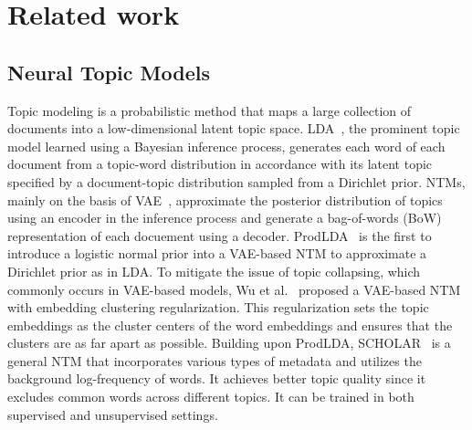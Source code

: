 \section{Related work}
\label{sec2}

\subsection{Neural Topic Models}
Topic modeling is a probabilistic method that maps a large collection of documents into a low-dimensional latent topic space.
LDA~\cite{blei2003latent}, the prominent topic model learned using a Bayesian inference process, generates each word of each document from a topic-word distribution in accordance with its latent topic specified by a document-topic distribution sampled from a Dirichlet prior. 
NTMs, mainly on the basis of VAE~\cite{welling2014auto}, approximate the posterior distribution of topics using an encoder in the inference process and generate a bag-of-words (BoW) representation of each docuement using a decoder. 
ProdLDA~\cite{srivastava2017autoencoding} is the first to introduce a logistic normal prior into a VAE-based NTM to approximate a Dirichlet prior as in LDA. 
To mitigate the issue of topic collapsing, which commonly occurs in VAE-based models, Wu et al.~\cite{wu2023effective} proposed a VAE-based NTM with embedding clustering regularization. This regularization sets the topic embeddings as the cluster centers of the word embeddings and ensures that the clusters are as far apart as possible.
Building upon ProdLDA, SCHOLAR~\cite{card2018neural} is a general NTM that incorporates various types of metadata and utilizes the background log-frequency of words. It achieves better topic quality since it excludes common words across different topics. It can be trained in both supervised and unsupervised settings.

